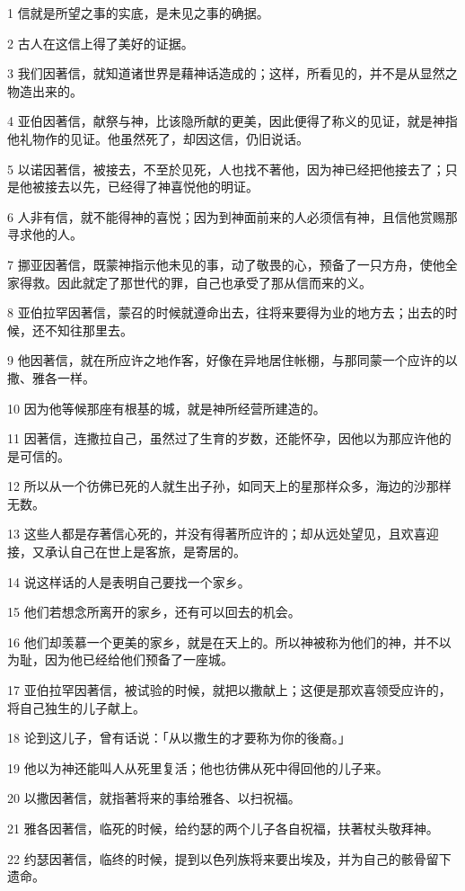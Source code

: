 \par 1 信就是所望之事的实底，是未见之事的确据。
\par 2 古人在这信上得了美好的证据。
\par 3 我们因著信，就知道诸世界是藉神话造成的；这样，所看见的，并不是从显然之物造出来的。
\par 4 亚伯因著信，献祭与神，比该隐所献的更美，因此便得了称义的见证，就是神指他礼物作的见证。他虽然死了，却因这信，仍旧说话。
\par 5 以诺因著信，被接去，不至於见死，人也找不著他，因为神已经把他接去了；只是他被接去以先，已经得了神喜悦他的明证。
\par 6 人非有信，就不能得神的喜悦；因为到神面前来的人必须信有神，且信他赏赐那寻求他的人。
\par 7 挪亚因著信，既蒙神指示他未见的事，动了敬畏的心，预备了一只方舟，使他全家得救。因此就定了那世代的罪，自己也承受了那从信而来的义。
\par 8 亚伯拉罕因著信，蒙召的时候就遵命出去，往将来要得为业的地方去；出去的时候，还不知往那里去。
\par 9 他因著信，就在所应许之地作客，好像在异地居住帐棚，与那同蒙一个应许的以撒、雅各一样。
\par 10 因为他等候那座有根基的城，就是神所经营所建造的。
\par 11 因著信，连撒拉自己，虽然过了生育的岁数，还能怀孕，因他以为那应许他的是可信的。
\par 12 所以从一个彷佛已死的人就生出子孙，如同天上的星那样众多，海边的沙那样无数。
\par 13 这些人都是存著信心死的，并没有得著所应许的；却从远处望见，且欢喜迎接，又承认自己在世上是客旅，是寄居的。
\par 14 说这样话的人是表明自己要找一个家乡。
\par 15 他们若想念所离开的家乡，还有可以回去的机会。
\par 16 他们却羡慕一个更美的家乡，就是在天上的。所以神被称为他们的神，并不以为耻，因为他已经给他们预备了一座城。
\par 17 亚伯拉罕因著信，被试验的时候，就把以撒献上；这便是那欢喜领受应许的，将自己独生的儿子献上。
\par 18 论到这儿子，曾有话说：「从以撒生的才要称为你的後裔。」
\par 19 他以为神还能叫人从死里复活；他也彷佛从死中得回他的儿子来。
\par 20 以撒因著信，就指著将来的事给雅各、以扫祝福。
\par 21 雅各因著信，临死的时候，给约瑟的两个儿子各自祝福，扶著杖头敬拜神。
\par 22 约瑟因著信，临终的时候，提到以色列族将来要出埃及，并为自己的骸骨留下遗命。
